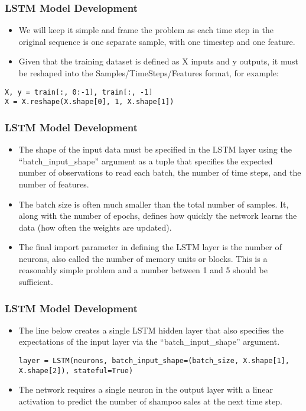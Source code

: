 \begin{frame}[fragile] \frametitle{LSTM Model Development}
\begin{itemize}
\item 
    We will keep it simple and frame the problem as each time step in the original sequence is one separate sample, with one timestep and one feature.
    \item Given that the training dataset is defined as X inputs and y outputs, it must be reshaped into the Samples/TimeSteps/Features format, for example:
\end{itemize}
\begin{lstlisting}
X, y = train[:, 0:-1], train[:, -1]
X = X.reshape(X.shape[0], 1, X.shape[1])
\end{lstlisting}   
\end{frame}

\begin{frame}[fragile] \frametitle{LSTM Model Development}
\begin{itemize}
\item The shape of the input data must be specified in the LSTM layer using the ``batch\_input\_shape'' argument as a tuple that specifies the expected number of observations to read each batch, the number of time steps, and the number of features.
\item The batch size is often much smaller than the total number of samples. It, along with the number of epochs, defines how quickly the network learns the data (how often the weights are updated).
\item 
The final import parameter in defining the LSTM layer is the number of neurons, also called the number of memory units or blocks. This is a reasonably simple problem and a number between 1 and 5 should be sufficient.
\end{itemize}
\end{frame}

\begin{frame}[fragile] \frametitle{LSTM Model Development}
\begin{itemize}
\item The line below creates a single LSTM hidden layer that also specifies the expectations of the input layer via the ``batch\_input\_shape'' argument.
\begin{lstlisting}
layer = LSTM(neurons, batch_input_shape=(batch_size, X.shape[1], X.shape[2]), stateful=True)
\end{lstlisting}   
\item The network requires a single neuron in the output layer with a linear activation to predict the number of shampoo sales at the next time step.
\end{itemize}
\end{frame}

